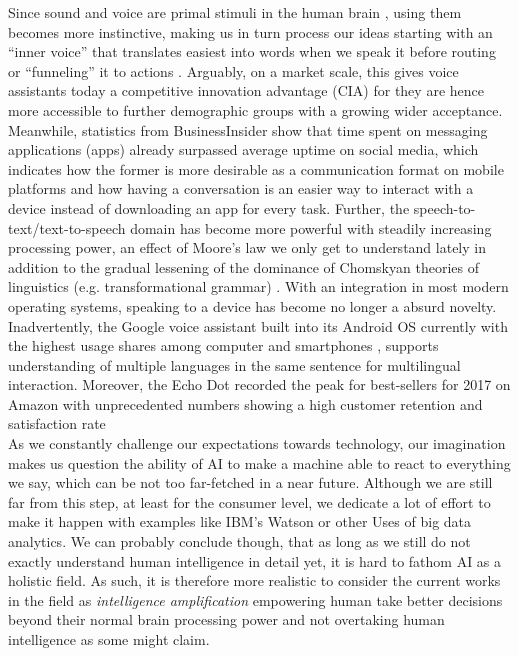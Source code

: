 Since sound and voice are primal stimuli in the human brain \cite{voiceneurons}, using them becomes more instinctive, making us in turn process our ideas starting with an ``inner voice'' that translates easiest into words when we speak it before routing or ``funneling'' it to actions \cite{alexapc18}.
Arguably, on a market scale, this gives voice assistants today a competitive innovation advantage (CIA) for they are hence more accessible to further demographic groups with a growing wider acceptance.\\

Meanwhile, statistics from BusinessInsider \cite{businsider} show that time spent on messaging applications (apps) already surpassed average uptime on social media, which indicates how the former is more desirable as a communication format on mobile platforms and how having a conversation is an easier way to interact with a device instead of downloading an app for every task. %
Further, the speech-to-text/text-to-speech domain has become more powerful with steadily increasing processing power, an effect of Moore's law we only get to understand lately in addition to the gradual lessening of the dominance of Chomskyan theories of linguistics (e.g. transformational grammar) \cite{wiki:nlp}.
With an integration in most modern operating systems, speaking to a device has become no longer a absurd novelty. 
Inadvertently, the Google voice assistant built into its Android OS currently with the highest usage shares among computer and smartphones \cite{wiki:gartnerreports}, supports understanding of multiple languages in the same sentence for multilingual interaction. %
Moreover, the Echo Dot recorded the peak for best-sellers for 2017 on Amazon with unprecedented numbers showing a high customer retention and satisfaction rate \cite{cnbcAlexa}\\

As we constantly challenge our expectations towards technology, our imagination makes us question the ability of AI to make a machine able to react to everything we say, which can be not too far-fetched in a near future.
Although we are still far from this step, at least for the consumer level, we dedicate a lot of effort to make it happen with examples like IBM's Watson or other Uses of big data analytics.
We can probably conclude though, that as long as we still do not exactly understand human intelligence in detail yet, it is hard to fathom AI as a holistic field. As such, it is therefore more realistic to consider the current works in the field as \textit{intelligence amplification} \cite{alexapc18} empowering human take better decisions beyond their normal brain processing power and not overtaking human intelligence as some might claim.
\\

